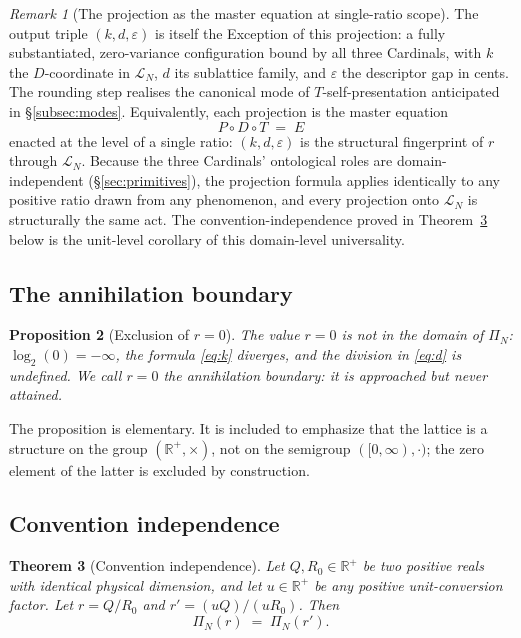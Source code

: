 \documentclass[11pt,a4paper]{article}
\newtheorem{theorem}{Theorem}[section]
\newtheorem{proposition}[theorem]{Proposition}
\theoremstyle{definition}
\theoremstyle{remark}
\newtheorem{remark}[theorem]{Remark}
\newcommand{\R}{\mathbb{R}}
\newcommand{\eps}{\varepsilon}
\newcommand{\PDT}{\ensuremath{P{\circ}D{\circ}T}}
\begin{document}
\begin{remark}[The projection as the master equation at single-ratio scope]\label{rem:single-ratio-exception}
The output triple $(k,d,\eps)$ is itself the Exception of this projection: a fully substantiated, zero-variance configuration bound by all three Cardinals, with $k$ the $D$-coordinate in $\mathcal{L}_{N}$, $d$ its sublattice family, and $\eps$ the descriptor gap in cents. The rounding step realises the canonical mode of $T$-self-presentation anticipated in \S\ref{subsec:modes}. Equivalently, each projection is the master equation
\[
\PDT \;=\; E
\]
enacted at the level of a single ratio: $(k,d,\eps)$ is the structural fingerprint of $r$ through $\mathcal{L}_{N}$. Because the three Cardinals' ontological roles are domain-independent (\S\ref{sec:primitives}), the projection formula applies identically to any positive ratio drawn from any phenomenon, and every projection onto $\mathcal{L}_{N}$ is structurally the same act. The convention-independence proved in Theorem~\ref{thm:conv} below is the unit-level corollary of this domain-level universality.
\end{remark}

\subsection{The annihilation boundary}

\begin{proposition}[Exclusion of $r=0$]\label{prop:zero}
The value $r=0$ is not in the domain of $\Pi_{N}$: $\log_{2}(0)=-\infty$, the formula \eqref{eq:k} diverges, and the division in \eqref{eq:d} is undefined. We call $r=0$ the \emph{annihilation boundary}: it is approached but never attained.
\end{proposition}

The proposition is elementary. It is included to emphasize that the lattice is a structure on the group $(\R^{+},\times)$, not on the semigroup $([0,\infty),\cdot)$; the zero element of the latter is excluded by construction.

\subsection{Convention independence}

\begin{theorem}[Convention independence]\label{thm:conv}
Let $Q,R_{0}\in\R^{+}$ be two positive reals with identical physical dimension, and let $u\in\R^{+}$ be any positive unit-conversion factor. Let $r = Q/R_{0}$ and $r' = (uQ)/(uR_{0})$. Then
\[
\Pi_{N}(r) \;=\; \Pi_{N}(r').
\]
\end{theorem}
\end{document}

